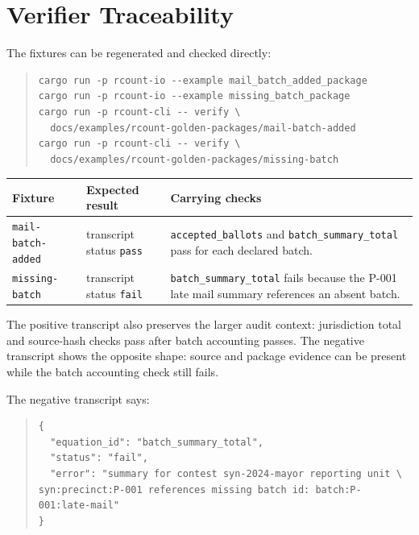 \section{Verifier Traceability}

The fixtures can be regenerated and checked directly:

\begin{quote}
\footnotesize
\begin{verbatim}
cargo run -p rcount-io --example mail_batch_added_package
cargo run -p rcount-io --example missing_batch_package
cargo run -p rcount-cli -- verify \
  docs/examples/rcount-golden-packages/mail-batch-added
cargo run -p rcount-cli -- verify \
  docs/examples/rcount-golden-packages/missing-batch
\end{verbatim}
\end{quote}

\begin{center}
\small
\begin{tabularx}{\textwidth}{lXX}
\toprule
Fixture & Expected result & Carrying checks \\
\midrule
\texttt{mail-batch-added} & transcript status \texttt{pass} & \texttt{accepted\_ballots} and \texttt{batch\_summary\_total} pass for each declared batch. \\
\texttt{missing-batch} & transcript status \texttt{fail} & \texttt{batch\_summary\_total} fails because the P-001 late mail summary references an absent batch. \\
\bottomrule
\end{tabularx}
\end{center}

The positive transcript also preserves the larger audit context: jurisdiction
total and source-hash checks pass after batch accounting passes. The negative
transcript shows the opposite shape: source and package evidence can be present
while the batch accounting check still fails.

The negative transcript says:
\begin{quote}
\footnotesize
\begin{verbatim}
{
  "equation_id": "batch_summary_total",
  "status": "fail",
  "error": "summary for contest syn-2024-mayor reporting unit \
syn:precinct:P-001 references missing batch id: batch:P-001:late-mail"
}
\end{verbatim}
\end{quote}
